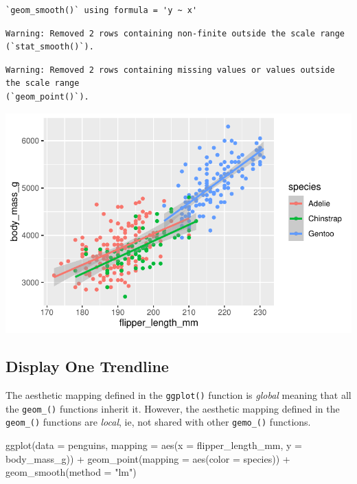 \documentclass[
  letterpaper,
  DIV=11,
  numbers=noendperiod]{scrreprt}
\newenvironment{Shaded}{\begin{snugshade}}{\end{snugshade}}
\newcommand{\AttributeTok}[1]{\textcolor[rgb]{0.40,0.45,0.13}{#1}}
\newcommand{\FunctionTok}[1]{\textcolor[rgb]{0.28,0.35,0.67}{#1}}
\newcommand{\NormalTok}[1]{\textcolor[rgb]{0.00,0.23,0.31}{#1}}
\newcommand{\SpecialCharTok}[1]{\textcolor[rgb]{0.37,0.37,0.37}{#1}}
\newcommand{\StringTok}[1]{\textcolor[rgb]{0.13,0.47,0.30}{#1}}
\begin{document}
\begin{verbatim}
`geom_smooth()` using formula = 'y ~ x'
\end{verbatim}

\begin{verbatim}
Warning: Removed 2 rows containing non-finite outside the scale range
(`stat_smooth()`).
\end{verbatim}

\begin{verbatim}
Warning: Removed 2 rows containing missing values or values outside the scale range
(`geom_point()`).
\end{verbatim}

\includegraphics{src/r-for-data-science/01-data-viz_files/figure-pdf/unnamed-chunk-12-1.pdf}

\subsection{Display One Trendline}\label{display-one-trendline}

The aesthetic mapping defined in the \texttt{ggplot()} function is
\emph{global} meaning that all the \texttt{geom\_()} functions inherit
it. However, the aesthetic mapping defined in the \texttt{geom\_()}
functions are \emph{local}, ie, not shared with other \texttt{gemo\_()}
functions.

\begin{Shaded}
\begin{Highlighting}[]
\FunctionTok{ggplot}\NormalTok{(}\AttributeTok{data =}\NormalTok{ penguins,}
       \AttributeTok{mapping =} \FunctionTok{aes}\NormalTok{(}\AttributeTok{x =}\NormalTok{ flipper\_length\_mm, }\AttributeTok{y =}\NormalTok{ body\_mass\_g)) }\SpecialCharTok{+}
  \FunctionTok{geom\_point}\NormalTok{(}\AttributeTok{mapping =} \FunctionTok{aes}\NormalTok{(}\AttributeTok{color =}\NormalTok{ species)) }\SpecialCharTok{+}
  \FunctionTok{geom\_smooth}\NormalTok{(}\AttributeTok{method =} \StringTok{"lm"}\NormalTok{)}
\end{Highlighting}
\end{Shaded}
\end{document}
